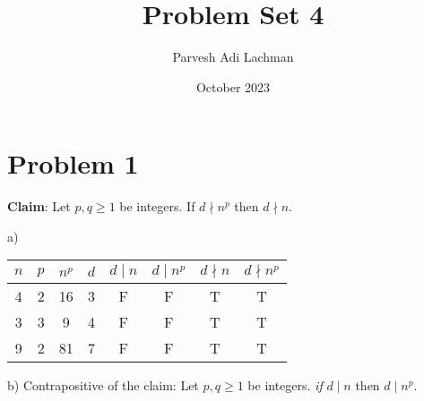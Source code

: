 \documentclass{article}
\title{Problem Set 4}
\author{Parvesh Adi Lachman}
\date{October 2023}
\begin{document}
\maketitle

\section{Problem 1}

\textbf{Claim}: Let $p,q\ge1$ be integers. If $d \nmid n^p$ then $d \nmid n$.\vspace{10pt}

a) \begin{flushleft}
\begin{tabular}{|c|c|c|c|c|c|c|c|}
\hline
$n$ & $p$ & $n^p$ & $d$ & $d \mid n$ & $d \mid n^p$ & $d \nmid n$ & $d \nmid n^p$ \\
\hline
4 & 2 & 16 & 3 & F & F & T & T \\
3 & 3 & 9 & 4 & F & F & T & T \\
9 & 2 & 81 & 7 & F & F & T & T \\
\hline
\end{tabular}
\end{flushleft} \vspace{10pt}

b) Contrapositive of the claim: Let $p,q\ge1$ be integers. \textit{if} $d\;|\;n$ then $d\;|\;n^p$.\vspace{10pt}
\end{document}
